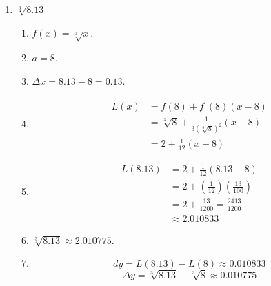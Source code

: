 \documentclass[nooutcomes,handout]{ximera}
\begin{document}
\begin{problem}
\begin{freeResponse}
\begin{enumerate}
  \item $ \sqrt[3]{8.13}$
  \begin{enumerate}
    \item  $f(x) = \sqrt[3]{x}$.
    \item  $a=8$.
    \item  $\Delta x = 8.13 - 8 = 0.13$.
    \item 
      \begin{align*}
        L(x) &= f(8) + f^\prime (8) (x-8) \\
             &= \sqrt[3]{8} + \frac{1}{3 (\sqrt[3]{8})^2} \left( x - 8 \right) \\
            &= 2 + \frac{1}{12} (x-8) 
      \end{align*}
    \item  
      \begin{align*}
        L(8.13) &= 2 + \frac{1}{12} (8.13 - 8) \\
                &= 2 + \left( \frac{1}{12} \right) \left( \frac{13}{100} \right) \\
                &= 2 + \frac{13}{1200} = \frac{2413}{1200} \\
                &\approx 2.010833
      \end{align*}
    \item  $\sqrt[3]{8.13} \approx 2.010775$.
    \item  
      $$ dy = L(8.13) - L(8) \approx 0.010833 $$
      $$ \Delta y = \sqrt[3]{8.13} - \sqrt[3]{8} \approx 0.010775 $$
    \end{enumerate}
    \end{enumerate}
\end{freeResponse}
\end{problem}
\end{document}
